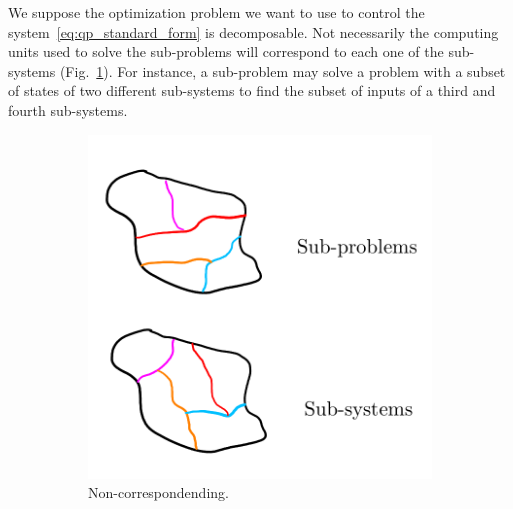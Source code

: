 \documentclass[../main.tex]{subfiles}
\begin{document}
We suppose the optimization problem we want to use to control the system~\eqref{eq:qp_standard_form} is decomposable.
Not necessarily the computing units used to solve the sub-problems will correspond to each one of the sub-systems (Fig.~\ref{fig:noncorresponding_division_system_problem}).
For instance, a sub-problem may solve a problem with a subset of states of two different sub-systems to find the subset of inputs of a third and fourth sub-systems.

\begin{figure}[h] \centering
  \begin{subfigure}{.4\textwidth}
    \includegraphics[width=\textwidth,clip,trim=0cm 1.8cm 0 2.5cm]{../img/noncorresponding_system_problem.png}
    \caption{Non-correspondending.}\label{fig:noncorresponding_division_system_problem}
  \end{subfigure} \hfill
  \begin{subfigure}{.4\textwidth} \centering

\end{subfigure}
\end{figure}
\end{document}
